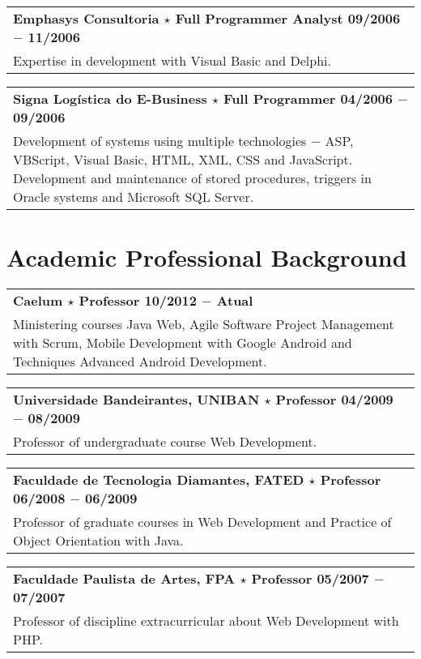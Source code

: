 \documentclass[a4paper, oneside, final]{scrartcl}
\newcommand{\vspc}{\vspace{0.15cm}} %
\begin{document}
\begin{center}
\begin{tabularx}{1\linewidth}{X}
{\bf Emphasys Consultoria $\star$ Full Programmer Analyst \hfill 09/2006 $-$ 11/2006} \\
Expertise in development with Visual Basic and Delphi. \vspc\\
\end{tabularx}

\begin{tabularx}{1\linewidth}{X}
{\bf Signa Logística do E-Business $\star$ Full Programmer \hfill 04/2006 $-$ 09/2006} \\
Development of systems using multiple technologies $-$ ASP, VBScript, Visual Basic, HTML, XML, CSS and JavaScript. Development and maintenance of stored procedures, triggers in Oracle systems and Microsoft SQL Server. \vspc\\
\end{tabularx}

\section{Academic Professional Background}
\begin{tabularx}{1\linewidth}{X}
{\bf Caelum $\star$ Professor \hfill 10/2012 $-$ Atual} \\
Ministering courses Java Web, Agile Software Project Management with Scrum, Mobile Development with Google Android and Techniques Advanced Android Development. \vspc\\
\end{tabularx}

\begin{tabularx}{1\linewidth}{X}
{\bf Universidade Bandeirantes, UNIBAN $\star$ Professor \hfill 04/2009 $-$ 08/2009} \\
Professor of undergraduate course Web Development. \vspc\\
\end{tabularx}

\begin{tabularx}{1\linewidth}{X}
{\bf Faculdade de Tecnologia Diamantes, FATED $\star$ Professor \hfill 06/2008 $-$ 06/2009} \\
Professor of graduate courses in Web Development and Practice of Object Orientation with Java. \vspc\\
\end{tabularx}

\begin{tabularx}{1\linewidth}{X}
{\bf Faculdade Paulista de Artes, FPA $\star$ Professor  \hfill 05/2007 $-$ 07/2007} \\
Professor of discipline extracurricular about Web Development with PHP. \vspc\\
\end{tabularx}



\end{center}
\end{document}
